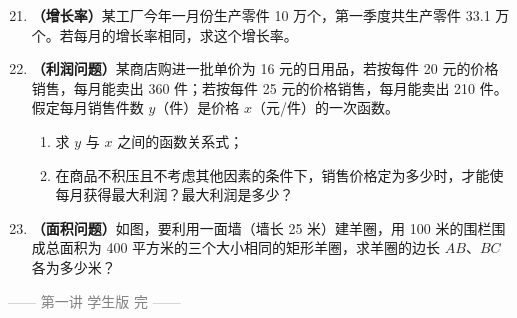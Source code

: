 \documentclass[12pt, a4paper]{article}
\begin{document}
\begin{examplebox}
    \begin{enumerate}[label=\textbf{例\arabic*.}]
        \setcounter{enumi}{20}
        \item \textbf{（增长率）}某工厂今年一月份生产零件 10 万个，第一季度共生产零件 33.1 万个。若每月的增长率相同，求这个增长率。
        
        \vspace{0.3cm}
        
        \item \textbf{（利润问题）}某商店购进一批单价为 16 元的日用品，若按每件 20 元的价格销售，每月能卖出 360 件；若按每件 25 元的价格销售，每月能卖出 210 件。假定每月销售件数 $y$（件）是价格 $x$（元/件）的一次函数。
        \begin{enumerate}
            \item[(1)] 求 $y$ 与 $x$ 之间的函数关系式；
            \item[(2)] 在商品不积压且不考虑其他因素的条件下，销售价格定为多少时，才能使每月获得最大利润？最大利润是多少？
        \end{enumerate}
        
        \vspace{0.3cm}
        
        \item \textbf{（面积问题）}如图，要利用一面墙（墙长 25 米）建羊圈，用 100 米的围栏围成总面积为 400 平方米的三个大小相同的矩形羊圈，求羊圈的边长 $AB$、$BC$ 各为多少米？
        
        \begin{center}
        \end{center}
    \end{enumerate}
\end{examplebox}

\begin{answerblank}[第21-23题]
    \vspace{10cm}
\end{answerblank}

\vfill
\begin{center}
    \small \textcolor{gray}{—— 第一讲 学生版 完 ——}
\end{center}
\end{document}

